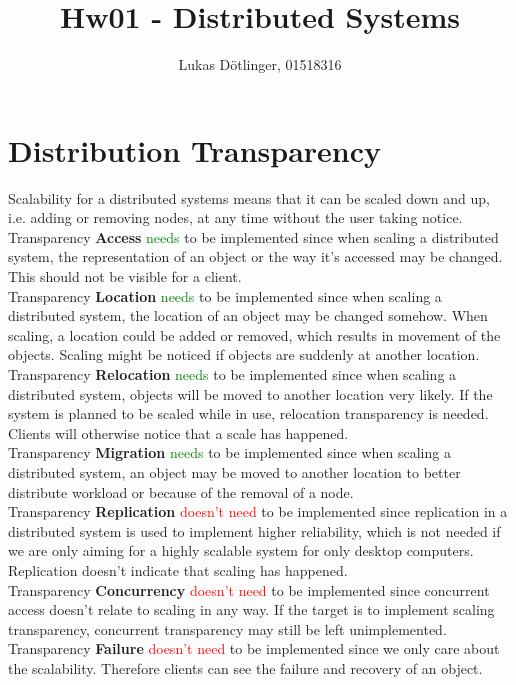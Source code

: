 \documentclass{article}
\begin{document}
  \title{Hw01 - Distributed Systems}
  \date{}
  \author{Lukas Dötlinger, 01518316}

  \maketitle
  
  \section{Distribution Transparency}
    
    Scalability for a distributed systems means that it can be scaled down and up, i.e. adding or removing nodes, at any time without the user taking notice.\\
    \newline
    Transparency \textbf{Access} \textcolor{green}{needs} to be implemented since when scaling a distributed system, the representation of an object or the way it's accessed may be changed. This should not be visible for a client.\\
    Transparency \textbf{Location} \textcolor{green}{needs} to be implemented since when scaling a distributed system, the location of an object may be changed somehow. When scaling, a location could be added or removed, which results in movement of the objects. Scaling might be noticed if objects are suddenly at another location.\\
    Transparency \textbf{Relocation} \textcolor{green}{needs} to be implemented since when scaling a distributed system, objects will be moved to another location very likely. If the system is planned to be scaled while in use, relocation transparency is needed. Clients will otherwise notice that a scale has happened.\\
    Transparency \textbf{Migration} \textcolor{green}{needs} to be implemented since when scaling a distributed system, an object may be moved to another location to better distribute workload or because of the removal of a node.\\
    Transparency \textbf{Replication} \textcolor{red}{doesn't need} to be implemented since replication in a distributed system is used to implement higher reliability, which is not needed if we are only aiming for a highly scalable system for only desktop computers. Replication doesn't indicate that scaling has happened.\\
    Transparency \textbf{Concurrency} \textcolor{red}{doesn't need} to be implemented since concurrent access doesn't relate to scaling in any way. If the target is to implement scaling transparency, concurrent transparency may still be left unimplemented.\\
    Transparency \textbf{Failure} \textcolor{red}{doesn't need} to be implemented since we only care about the scalability. Therefore clients can see the failure and recovery of an object.\\
    
\end{document}
